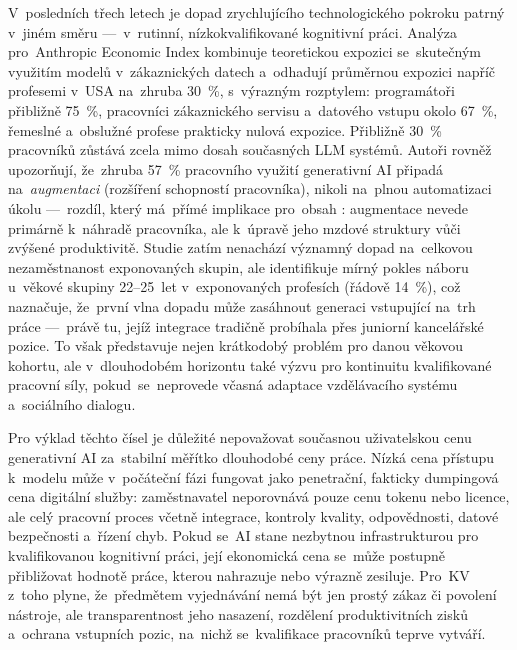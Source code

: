 V~posledních třech letech je dopad zrychlujícího technologického pokroku patrný v~jiném směru ---~v~rutinní, nízkokvalifikované kognitivní práci. Analýza pro~Anthropic Economic Index kombinuje teoretickou expozici  se~skutečným využitím modelů
v~zákaznických datech a~odhadují průměrnou expozici
napříč profesemi v~USA na~zhruba \SI{30}{\percent}, s~výrazným rozptylem:
programátoři přibližně \SI{75}{\percent}, pracovníci zákaznického servisu
a~datového vstupu okolo \SI{67}{\percent}, řemeslné a~obslužné profese
prakticky nulová expozice. Přibližně \SI{30}{\percent} pracovníků zůstává
zcela mimo dosah současných \ac{LLM} systémů. Autoři rovněž upozorňují,
že~zhruba \SI{57}{\percent} pracovního využití generativní \acs{AI} připadá
na~\emph{augmentaci} (rozšíření schopností pracovníka), nikoli na~plnou
automatizaci úkolu ---~rozdíl, který má~přímé implikace pro~obsah :
augmentace nevede primárně k~náhradě pracovníka, ale k~úpravě jeho mzdové
struktury vůči zvýšené produktivitě. Studie zatím nenachází významný
dopad na~celkovou nezaměstnanost exponovaných skupin, ale identifikuje
mírný pokles náboru u~věkové skupiny 22--25~let v~exponovaných profesích
(řádově \SI{14}{\percent}), což naznačuje, že~první vlna dopadu může zasáhnout
generaci vstupující na~trh práce ---~právě tu, jejíž integrace tradičně
probíhala přes juniorní kancelářské pozice. To však představuje nejen krátkodobý
problém pro danou věkovou kohortu, ale v~dlouhodobém horizontu také výzvu pro
kontinuitu kvalifikované pracovní síly, pokud~se~neprovede včasná adaptace vzdělávacího systému a~sociálního dialogu.~\cite{Massenkoff_LaborMarketAI_2026}\par

Pro výklad těchto čísel je důležité nepovažovat současnou uživatelskou cenu generativní \acs{AI} za~stabilní měřítko dlouhodobé ceny práce. Nízká cena přístupu k~modelu může v~počáteční fázi fungovat jako penetrační, fakticky dumpingová cena digitální služby: zaměstnavatel neporovnává pouze cenu tokenu nebo licence, ale celý pracovní proces včetně integrace, kontroly kvality, odpovědnosti, datové bezpečnosti a~řízení chyb. Pokud se~\acs{AI} stane nezbytnou infrastrukturou pro kvalifikovanou kognitivní práci, její ekonomická cena se~může postupně přibližovat hodnotě práce, kterou nahrazuje nebo výrazně zesiluje. Pro~\ac{KV} z~toho plyne, že~předmětem vyjednávání nemá být jen prostý zákaz či povolení nástroje, ale transparentnost jeho nasazení, rozdělení produktivitních zisků a~ochrana vstupních pozic, na~nichž se~kvalifikace pracovníků teprve vytváří.~\cite{Massenkoff_LaborMarketAI_2026}~\cite{Petit_AIEmploymentImpact_EU_2026}\par

